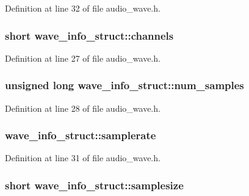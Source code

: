 Definition at line 32 of file audio\+\_\+wave.\+h.

\subsubsection[{\texorpdfstring{channels}{channels}}]{\setlength{\rightskip}{0pt plus 5cm}short wave\+\_\+info\+\_\+struct\+::channels}\hypertarget{structwave__info__struct_a7eb1e21540aff20dae3ef6a212d4db18}{}\label{structwave__info__struct_a7eb1e21540aff20dae3ef6a212d4db18}


Definition at line 27 of file audio\+\_\+wave.\+h.

\subsubsection[{\texorpdfstring{num\+\_\+samples}{num_samples}}]{\setlength{\rightskip}{0pt plus 5cm}unsigned long wave\+\_\+info\+\_\+struct\+::num\+\_\+samples}\hypertarget{structwave__info__struct_a51d3485507892fe35d23abcdb961db36}{}\label{structwave__info__struct_a51d3485507892fe35d23abcdb961db36}


Definition at line 28 of file audio\+\_\+wave.\+h.

\subsubsection[{\texorpdfstring{samplerate}{samplerate}}]{ wave\+\_\+info\+\_\+struct\+::samplerate}\hypertarget{structwave__info__struct_a9f2422fb5acbde06cacf6bd1799deb37}{}\label{structwave__info__struct_a9f2422fb5acbde06cacf6bd1799deb37}


Definition at line 31 of file audio\+\_\+wave.\+h.

\subsubsection[{\texorpdfstring{samplesize}{samplesize}}]{\setlength{\rightskip}{0pt plus 5cm}short wave\+\_\+info\+\_\+struct\+::samplesize}\hypertarget{structwave__info__struct_a00bacff2a6bca20e7b0833aa5a4acce8}{}\label{structwave__info__struct_a00bacff2a6bca20e7b0833aa5a4acce8}


